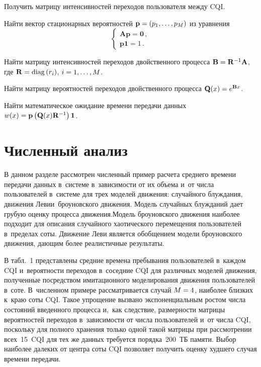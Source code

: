 \begin{multicols}{2}
\begin{description}
Получить матрицу интенсивностей переходов пользователя меж\-ду CQI.



\item[Шаг 2.] Найти вектор стационарных вероятностей 
$\mathbf{p}\hm=(p_1, \ldots ,p_M)$ из уравнения
$$
\left\{ 
\begin{array}{l}
\mathbf{Ap}=\mathbf{0}\,,\\
\mathbf{p1} =1\,.
\end{array}
\right.
$$

\item[Шаг 3.] Найти матрицу интенсивностей переходов двойственного процесса 
$\mathbf{B}\hm= \mathbf{R}^{-1}\mathbf{A}$, где $\mathbf{R}\hm= \mathrm{diag}\,(r_i)$, 
$i\hm=1, \ldots , M$.

\item[Шаг 4.] Найти матрицу вероятностей переходов двойственного процесса
$\mathbf{Q}(x)\hm= e^{\mathbf{B}x}$.

\item[Шаг 5.] Найти математическое ожидание времени передачи данных
$w(x)\hm= \mathbf{p}\left( \mathbf{Q}(x) \mathbf{R}^{-1}\right) \mathbf{1}$.
\end{description}

\section{Численный анализ}

   В данном разделе рассмотрен численный пример расчета среднего времени 
передачи данных в~системе в~зависимости от их объема и~от числа\linebreak 
пользователей в~системе для трех моделей движения: случайного блуж\-да\-ния, 
движения Леви\linebreak и~броуновского движения. Модель случайных блуж\-да\-ний дает 
грубую оценку процесса движения.\linebreak Модель броуновского движения наиболее 
подходит для описания случайного хаотического перемещения пользователей 
в~пределах соты. Движение Леви является обобщением модели броуновского 
движения, дающим более реалистичные результаты.
   
  В табл.~1 представлены средние времена пребывания пользователей в~каждом 
CQI и~вероятности переходов в~соседние CQI для различных моделей движения, 
полученные посредством имитационного моделирования движения 
пользователей в~соте. В~численном примере рассматривается случай $M\hm=4$, 
наиболее близких к~краю соты CQI. Такое упрощение вызвано 
экспоненциальным ростом числа состояний введенного процесса и,~как 
следствие, размерности матрицы вероятностей переходов в~зависимости от 
числа пользователей и~от числа CQI, поскольку для полного хранения только 
одной такой матрицы при рассмотрении всех~15~CQI для тех же данных 
требуется порядка~200~ТБ памяти. Выбор наиболее далеких от центра соты CQI 
позволяет получить оценку худшего случая времени передачи.


\end{multicols}

